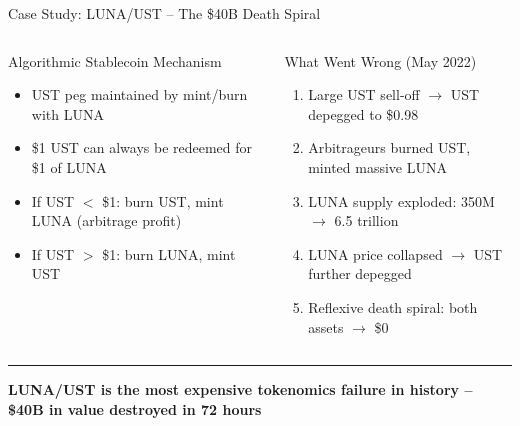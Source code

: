 \documentclass[8pt,aspectratio=169]{beamer}
\newcommand{\bottomnote}[1]{\vfill\vspace{-2mm}\textcolor{mllavender2}{\rule{\textwidth}{0.4pt}}\vspace{1mm}\footnotesize\textbf{#1}}
\begin{document}
\begin{frame}{Case Study: LUNA/UST -- The \$40B Death Spiral}
\begin{columns}[T]
\begin{block}{Algorithmic Stablecoin Mechanism}
\footnotesize
\begin{itemize}
  \item UST peg maintained by mint/burn with LUNA
  \item \$1 UST can always be redeemed for \$1 of LUNA
  \item If UST $<$ \$1: burn UST, mint LUNA (arbitrage profit)
  \item If UST $>$ \$1: burn LUNA, mint UST
\end{itemize}
\end{block}
\vspace{1mm}
\begin{alertblock}{\footnotesize What Went Wrong (May 2022)}
\footnotesize
\begin{enumerate}
  \item Large UST sell-off $\rightarrow$ UST depegged to \$0.98
  \item Arbitrageurs burned UST, minted massive LUNA
  \item LUNA supply exploded: 350M $\rightarrow$ 6.5 trillion
  \item LUNA price collapsed $\rightarrow$ UST further depegged
  \item Reflexive death spiral: both assets $\rightarrow$ \$0
\end{enumerate}
\end{alertblock}

\end{columns}
\bottomnote{LUNA/UST is the most expensive tokenomics failure in history -- \$40B in value destroyed in 72 hours}
\end{frame}
\end{document}
